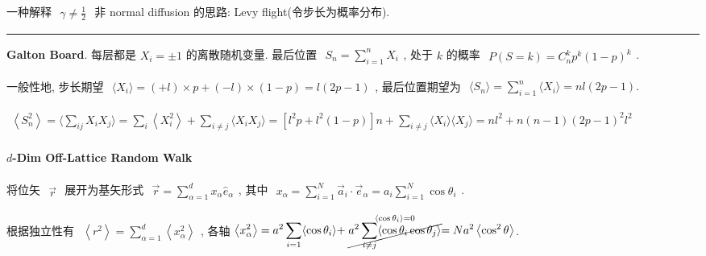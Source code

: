 \documentclass[../../main.tex]{subfiles}
\begin{document}
一种解释 $\begin{aligned}
    \gamma \neq \frac{1}{2}
\end{aligned}$ 非 normal diffusion 的思路: Levy flight(令步长为概率分布). 

\vspace{0.5em}\hrule\vspace{0.5em}

\textbf{Galton Board}. 每层都是 $X_{i}=\pm 1$ 的离散随机变量. 最后位置 $\begin{aligned}
    S_{n} = \sum_{i=1}^{n}X_{i}
\end{aligned}$, 处于 $k$ 的概率 $\begin{aligned} 
    P(S = k) = C_{n}^{k}p^{k}(1-p)^{k}
\end{aligned}$. 

一般性地, 步长期望 $\begin{aligned}
    \langle X_{i}\rangle = (+l)\times p + (-l)\times (1-p) = l(2p-1)
\end{aligned}$, 最后位置期望为 $\begin{aligned}
    \langle S_{n}\rangle = \sum_{i=1}^{n}\langle X_{i}\rangle = nl(2p-1).
\end{aligned}$

$\begin{aligned}
    \left\langle S_{n}^{2}\right\rangle = \langle\sum_{ij}X_{i}X_{j}\rangle = \sum_{i}\left\langle X_{i}^{2}\right\rangle + \sum_{i\neq j}\langle X_{i}X_{j}\rangle = \left[l^{2}p+l^{2}(1-p)\right]n + \sum_{i\neq j}\langle X_{i}\rangle\langle X_{j}\rangle = nl^{2} + n(n-1)(2p-1)^{2}l^{2}
\end{aligned}$

\paragraph{$d$-Dim Off-Lattice Random Walk} 将位矢 $\begin{aligned}
    \vec{r}
\end{aligned}$ 展开为基矢形式 $\begin{aligned}
    \vec{r} = \sum_{\alpha=1}^{d}x_{\alpha}\hat{e}_{\alpha} 
\end{aligned}$, 其中 $\begin{aligned}
    x_{\alpha} = \sum_{i=1}^{N}\vec{a}_{i}\cdot\vec{e}_{\alpha} = a_{i}\sum_{i=1}^{N}\cos{\theta_{i}}
\end{aligned}$. 

根据独立性有 $\begin{aligned}
    \left\langle r^{2}\right\rangle = \sum_{\alpha=1}^{d}\left\langle x_{\alpha}^{2}\right\rangle
\end{aligned}$, 各轴 $\begin{aligned}
    \left\langle x_{\alpha}^{2}\right\rangle = a^{2}\sum_{i=1}\langle\cos{\theta_{i}}\rangle + \stackrel{\langle\cos{\theta_{i}}\rangle = 0}{\cancel{a^{2}\sum_{i\neq j}\langle\cos{\theta_{i}}\cos{\theta_{j}}\rangle}} = Na^{2}\left\langle\cos^{2}{\theta}\right\rangle
\end{aligned}$. 
\end{document}
